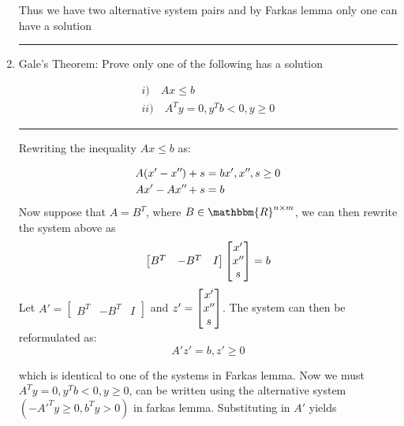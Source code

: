 \documentclass{article} %
\newcommand{\R}{\mathbbm{R}}
\newcommand*{\dprime}{^{\prime\prime}\mkern-1.2mu}
\begin{document}
\begin{enumerate}
Thus we have two alternative system pairs and by Farkas lemma only one can have a solution
\rule{\textwidth}{1pt}
\item Gale's Theorem: Prove only one of the following has a solution


\begin{gather*}
i) \quad Ax \leq b \\ 
ii) \quad A^T y = 0, y^T b < 0 , y \geq 0
\end{gather*}
\rule{\textwidth}{1pt}
Rewriting the inequality $Ax \leq b$ as:

\begin{equation*}
\begin{aligned}
A(x' - x \dprime) + s &= b  x', x \dprime, s \geq 0\\ 
Ax' - Ax \dprime + s &= b 
\end{aligned}
\end{equation*}
Now suppose that $A = B^T$, where $B \in \R^{n \times m}$, we can then rewrite the system above as
\begin{gather*}
\begin{bmatrix} B^T  & -B^T & I \end{bmatrix}  \begin{bmatrix} x' \\ x\dprime \\ s \end{bmatrix} = b
\end{gather*}
Let $A' = \begin{bmatrix} B^T  & -B^T & I \end{bmatrix} $ and $z' = \begin{bmatrix} x' \\ x\dprime \\ s \end{bmatrix}$. The system can then be reformulated as:
\[
A' z' = b, z' \geq 0
\]

which is identical to one of the systems in Farkas lemma. Now we must $A^T y = 0, y^T b < 0, y \geq 0$, can be written using the alternative system $(-A'^T y \geq 0, b^T y > 0)$ in farkas lemma. Substituting in $A'$ yields


\end{enumerate}
\end{document}
